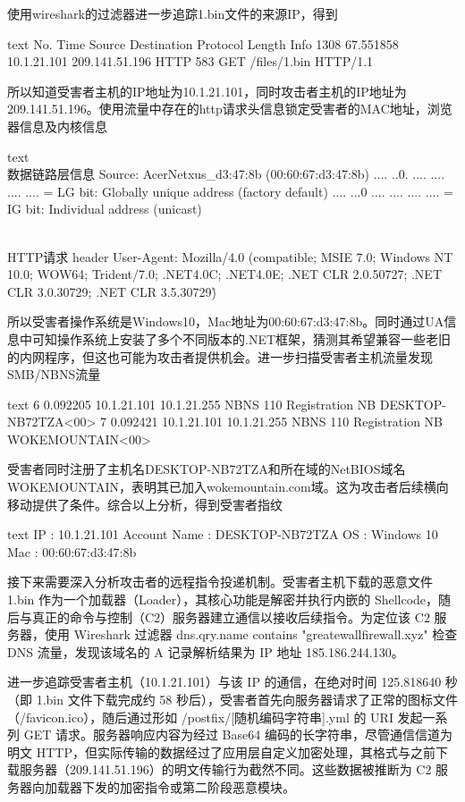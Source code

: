 \documentclass[12pt]{ctexart}
\begin{document}
		使用wireshark的过滤器进一步追踪1.bin文件的来源IP，得到
		\begin{codeblock}{text}
No.     Time        Source      Destination     Protocol Length  Info
1308    67.551858   10.1.21.101 209.141.51.196  HTTP     583     GET /files/1.bin HTTP/1.1 
		\end{codeblock}
		所以知道受害者主机的IP地址为10.1.21.101，同时攻击者主机的IP地址为209.141.51.196。使用流量中存在的http请求头信息锁定受害者的MAC地址，浏览器信息及内核信息
		\begin{codeblock}{text}
\\ 数据链路层信息
Source: AcerNetxus_d3:47:8b (00:60:67:d3:47:8b)
.... ..0. .... .... .... .... = LG bit: Globally unique address (factory default)
.... ...0 .... .... .... .... = IG bit: Individual address (unicast)

\\ HTTP请求 header
User-Agent: Mozilla/4.0 (compatible; MSIE 7.0; Windows NT 10.0; WOW64; Trident/7.0; .NET4.0C; .NET4.0E; .NET CLR 2.0.50727; .NET CLR 3.0.30729; .NET CLR 3.5.30729)\r\n
		\end{codeblock}
		所以受害者操作系统是Windows10，Mac地址为00:60:67:d3:47:8b。同时通过UA信息中可知操作系统上安装了多个不同版本的.NET框架，猜测其希望兼容一些老旧的内网程序，但这也可能为攻击者提供机会。进一步扫描受害者主机流量发现SMB/NBNS流量
		\begin{codeblock}{text}
6   0.092205    10.1.21.101 10.1.21.255 NBNS    110 Registration NB DESKTOP-NB72TZA<00>
7   0.092421    10.1.21.101 10.1.21.255 NBNS    110 Registration NB WOKEMOUNTAIN<00>
		\end{codeblock}
		受害者同时注册了主机名DESKTOP-NB72TZA和所在域的NetBIOS域名WOKEMOUNTAIN，表明其已加入wokemountain.com域。这为攻击者后续横向移动提供了条件。综合以上分析，得到受害者指纹
		\begin{codeblock}{text}
IP           : 10.1.21.101
Account Name : DESKTOP-NB72TZA
OS           : Windows 10
Mac          : 00:60:67:d3:47:8b
		\end{codeblock}
		接下来需要深入分析攻击者的远程指令投递机制。受害者主机下载的恶意文件 1.bin 作为一个加载器（Loader），其核心功能是解密并执行内嵌的 Shellcode，随后与真正的命令与控制（C2）服务器建立通信以接收后续指令。为定位该 C2 服务器，使用 Wireshark 过滤器 dns.qry.name contains "greatewallfirewall.xyz" 检查 DNS 流量，发现该域名的 A 记录解析结果为 IP 地址 185.186.244.130。
		
		进一步追踪受害者主机（10.1.21.101）与该 IP 的通信，在绝对时间 125.818640 秒（即 1.bin 文件下载完成约 58 秒后），受害者首先向服务器请求了正常的图标文件（/favicon.ico），随后通过形如 /postfix/[随机编码字符串].yml 的 URI 发起一系列 GET 请求。服务器响应内容为经过 Base64 编码的长字符串，尽管通信信道为明文 HTTP，但实际传输的数据经过了应用层自定义加密处理，其格式与之前下载服务器（209.141.51.196）的明文传输行为截然不同。这些数据被推断为 C2 服务器向加载器下发的加密指令或第二阶段恶意模块。
		
\end{document}
